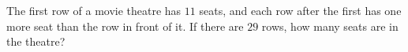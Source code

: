 The first row of a movie theatre has $11$ seats, and each row after the first has one more seat than the row in front of it. If there are $29$ rows, how many seats are in the theatre?
